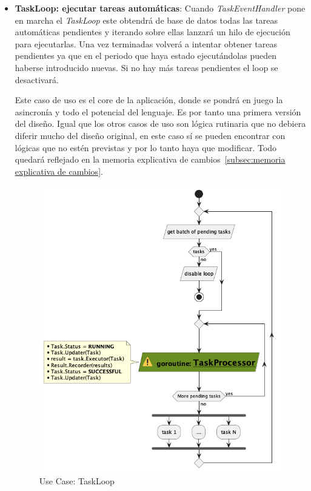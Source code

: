 \begin{itemize}
    \item \textbf{TaskLoop: ejecutar tareas automáticas}\label{ref:X}: Cuando \textit{TaskEventHandler} pone en marcha el \textit{TaskLoop} este obtendrá de base de datos todas las tareas automáticas pendientes y iterando sobre ellas lanzará un hilo de ejecución para ejecutarlas.
    Una vez terminadas volverá a intentar obtener tareas pendientes ya que en el periodo que haya estado ejecutándolas pueden haberse introducido nuevas.
    Si no hay más tareas pendientes el loop se desactivará.

    Este caso de uso es el core de la aplicación, donde se pondrá en juego la asincronía y todo el potencial del lenguaje.
    Es por tanto una primera versión del diseño.
    Igual que los otros casos de uso son lógica rutinaria que no debiera diferir mucho del diseño original, en este caso sí se pueden encontrar con lógicas que no estén previstas y por lo tanto haya que modificar.
    Todo quedará reflejado en la memoria explicativa de cambios~\cref{subsec:memoria explicativa de cambios}.

    \begin{figure}[H]
        \centering
        \includegraphics[height=0.4\textheight]{./part/Proyecto_ejecutivo/memoria_descriptiva/descripcionDelProyecto/manager/uml/executeTaskLoop}
        \caption{Use Case: TaskLoop}\label{fig:Use Case-TaskLoop}
    \end{figure}


\end{itemize}
